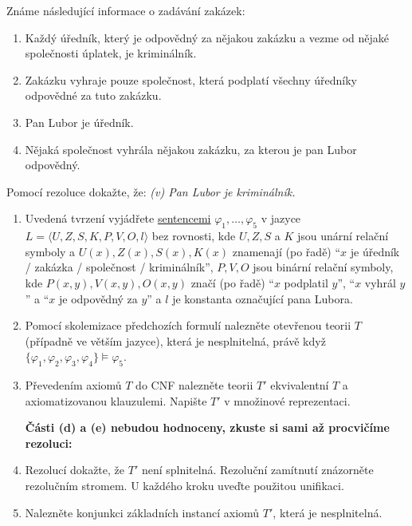 \documentclass[a4paper,12pt]{article}
\begin{document}
{\medskip\begin{problem}[3 body]  
    Známe následující informace o zadávání zakázek:
    \begin{enumerate}[label=(\roman*)] \it
        \item Každý úředník, který je odpovědný za nějakou zakázku a vezme od nějaké společnosti úplatek, je kriminálník.
        \item Zakázku vyhraje pouze společnost, která podplatí všechny úředníky odpovědné za tuto zakázku.
        \item Pan Lubor je úředník.
        \item Nějaká společnost vyhrála nějakou zakázku, za kterou je pan Lubor odpovědný.
    \end{enumerate}
    Pomocí rezoluce dokažte, že: {\it (v) Pan Lubor je kriminálník.}
    \begin{enumerate}
        \item Uvedená tvrzení vyjádřete \underline{sentencemi} $\varphi_1, \dots, \varphi_5$ v jazyce $L=\langle U, Z, S, K, P, V, O, l \rangle$ bez rovnosti, kde $U, Z, S$ a $K$ jsou unární relační symboly a $U(x), Z(x), S(x), K(x)$ znamenají (po řadě) ``$x$ je úředník / zakázka / společnost / kriminálník'', $P, V, O$ jsou binární relační symboly, kde $P(x,y), V(x,y), O(x,y)$ značí (po řadě) ``$x$ podplatil $y$'', ``$x$ vyhrál $y$'' a ``$x$ je odpovědný za $y$'' a $l$ je konstanta označující pana Lubora.
        \item Pomocí skolemizace předchozích formulí nalezněte otevřenou teorii $T$ (případně ve větším jazyce), která je nesplnitelná, právě když  $\{\varphi_1, \varphi_2, \varphi_3, \varphi_4\} \models \varphi_5$.
        \item Převedením axiomů $T$ do CNF nalezněte teorii $T'$ ekvivalentní $T$ a axiomatizovanou klauzulemi. Napište $T'$ v množinové reprezentaci.
        
        \bigskip

        \textbf{Části (d) a (e) nebudou hodnoceny, zkuste si sami až procvičíme rezoluci:}
        \item Rezolucí dokažte, že $T'$ není splnitelná. Rezoluční zamítnutí znázorněte rezolučním stromem. U každého kroku uveďte použitou unifikaci.
        \item Nalezněte konjunkci základních instancí axiomů $T'$, která je nesplnitelná.
    \end{enumerate}
\end{problem}


}
\end{document}
